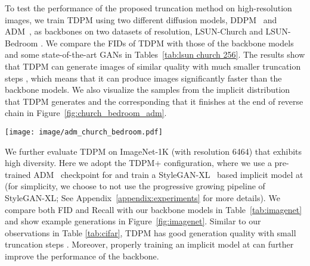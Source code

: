 \documentclass{article} \usepackage{iclr2023_conference,times}
\def\Figref#1{Figure~\ref{#1}}
\theoremstyle{plain}
\theoremstyle{definition}
\theoremstyle{remark}
\begin{document}
{To test the performance of the proposed truncation method on high-resolution images, we train TDPM using two different diffusion models, DDPM~\citep{ddpm} and ADM~\citep{Dhariwal2021DiffusionMB}, as backbones on two datasets of  resolution, LSUN-Church and LSUN-Bedroom \citep{lsun}. We compare the FIDs of TDPM with those of the backbone models and some state-of-the-art GANs in Tables~\ref{tab:lsun church 256}. The results show that TDPM can generate images of similar quality with much smaller truncation steps , which means that it can produce images significantly faster than the backbone models. We also visualize the samples from the implicit distribution  that TDPM generates and the corresponding  that it finishes at the end of reverse chain in \Figref{fig:church_bedroom_adm}.
\begin{table}[t]
\vspace{-3.5mm}
\begin{minipage}[t]{\linewidth}
\vspace{-1mm}
    \centering
    \texttt{[image: image/adm\_church\_bedroom.pdf]}\vspace{-2mm}
    \label{fig:church_bedroom_adm}
\end{minipage}
\vspace{-7mm}
\end{table}



{
We further evaluate TDPM on ImageNet-1K (with resolution 6464) that exhibits high diversity.
Here we adopt the TDPM+ configuration, where we use a pre-trained ADM~\citep{Dhariwal2021DiffusionMB} checkpoint for  and train a StyleGAN-XL~\citep{sauer2022styleganxl} based implicit model at  (for simplicity, we choose to not use the progressive growing pipeline of StyleGAN-XL; See Appendix~\ref{appendix:experiments} for more details). We compare both FID and Recall with our backbone models in Table~\ref{tab:imagenet} and show example generations in \Figref{fig:imagenet}. 
 Similar to our observations in Table \ref{tab:cifar}, TDPM has 
 good generation quality with small
 truncation steps . Moreover, properly training an implicit model at  can further improve the performance of the backbone. 
}




}
\end{document}
